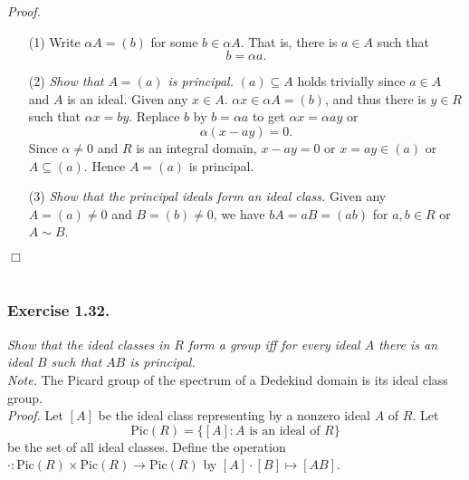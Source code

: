 \documentclass{article}
\begin{document}
\emph{Proof.}
\begin{enumerate}
\item[(1)]
Write $\alpha A = (b)$ for some $b \in \alpha A$.
That is, there is $a \in A$ such that
$$b = \alpha a.$$
\item[(2)]
\emph{Show that $A = (a)$ is principal.}
$(a) \subseteq A$ holds trivially since $a \in A$ and $A$ is an ideal.
Given any $x \in A$. $\alpha x \in \alpha A = (b)$, and thus
there is $y \in R$ such that $\alpha x = b y$.
Replace $b$ by $b = \alpha a$ to get $\alpha x = \alpha a y$ or
$$\alpha (x - ay) = 0.$$
Since $\alpha \neq 0$ and $R$ is an integral domain,
$x - ay = 0$ or $x = ay \in (a)$ or $A \subseteq (a)$.
Hence $A = (a)$ is principal.
\item[(3)]
\emph{Show that the principal ideals form an ideal class.}
Given any $A = (a) \neq 0$ and $B = (b) \neq 0$,
we have $bA = aB = (ab)$ for $a, b \in R$ or $A \sim B$.
\end{enumerate}
$\Box$ \\\\






\subsubsection*{Exercise 1.32.}
\emph{Show that the ideal classes in $R$ form a group iff for every ideal $A$
there is an ideal $B$ such that $AB$ is principal. } \\

\emph{Note.}
The Picard group of the spectrum of a Dedekind domain is its ideal class group. \\

\emph{Proof.}
Let $[A]$ be the ideal class representing by a nonzero ideal $A$ of $R$.
Let
$$\text{Pic}(R) = \{ [A] : A \text{ is an ideal of } R \}$$
be the set of all ideal classes.
Define the operation $\cdot : \text{Pic}(R) \times \text{Pic}(R) \to \text{Pic}(R)$
by $[A] \cdot [B] \mapsto [AB]$.
\end{document}
